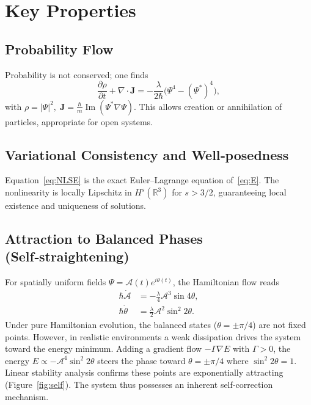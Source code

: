 \documentclass[11pt]{article}
\begin{document}
\section{Key Properties}
\subsection{Probability Flow}
Probability is not conserved; one finds
\[
\frac{\partial\rho}{\partial t} + \nabla\cdot\mathbf{J} = -\frac{\lambda}{2\hbar}\bigl(\Psi^4 - (\Psi^*)^4\bigr),
\]
with \(\rho=|\Psi|^2,\; \mathbf{J} = \frac{\hbar}{m}\operatorname{Im}(\Psi^*\nabla\Psi)\). This allows creation or annihilation of particles, appropriate for open systems.

\subsection{Variational Consistency and Well‑posedness}
Equation~\eqref{eq:NLSE} is the exact Euler–Lagrange equation of~\eqref{eq:E}. The nonlinearity is locally Lipschitz in \(H^s(\mathbb{R}^3)\) for \(s>3/2\), guaranteeing local existence and uniqueness of solutions.

\subsection{Attraction to Balanced Phases (Self‑straightening)}
For spatially uniform fields \(\Psi = \mathcal{A}(t) e^{i\theta(t)}\), the Hamiltonian flow reads
\begin{align}
\hbar \dot{\mathcal{A}} &= -\frac{\lambda}{4} \mathcal{A}^3 \sin 4\theta, \label{eq:amp}\\
\hbar \dot{\theta} &= \frac{\lambda}{2} \mathcal{A}^2 \sin^2 2\theta. \label{eq:phase}
\end{align}
Under pure Hamiltonian evolution, the balanced states (\(\theta=\pm\pi/4\)) are not fixed points. However, in realistic environments a weak dissipation drives the system toward the energy minimum. Adding a gradient flow \(-\Gamma \nabla E\) with \(\Gamma>0\), the energy \(E \propto -\mathcal{A}^4\sin^2 2\theta\) steers the phase toward \(\theta = \pm\pi/4\) where \(\sin^2 2\theta=1\). Linear stability analysis confirms these points are exponentially attracting (Figure~\ref{fig:self}). The system thus possesses an inherent self‑correction mechanism.
\end{document}
